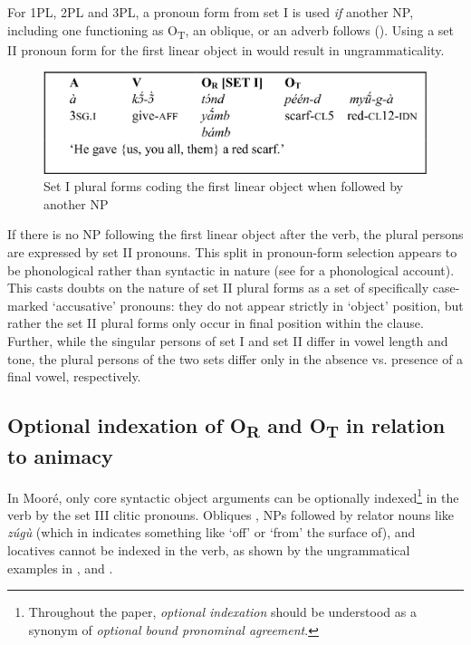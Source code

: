 \documentclass[output=paper]{langsci/langscibook}
\begin{document}
For 1PL, 2PL and 3PL, a pronoun form from set I is used \textit{if} another NP, including one functioning as O\textsubscript{T}, an oblique, or an adverb follows (). Using a set II pronoun form for the first linear object in  would result in ungrammaticality.

\begin{figure}[h]
\includegraphics[width=\textwidth]{figures/pacchiarottifig2}
\caption{Set I plural forms coding the first linear object when followed by another NP}
\label{fig:2.pacchiarotti}
\end{figure}

If there is no NP following the first linear object after the verb, the plural persons are expressed by set II pronouns. This split in pronoun-form selection appears to be phonological rather than syntactic in nature (see \citealt{peterson1971} for a phonological account). This casts doubts on the nature of set II plural forms as a set of specifically case-marked `accusative' pronouns: they do not appear strictly in `object' position, but rather the set II plural forms only occur in final position within the clause. Further, while the singular persons of set I and set II differ in vowel length and tone, the plural persons of the two sets differ only in the absence vs. presence of a final vowel, respectively. 

\subsection{Optional indexation of O\textsubscript{R} and O\textsubscript{T} in relation to animacy}\label{§4.4:optional.pacchiarotti}

In Mooré, only core syntactic object arguments can be optionally indexed\footnote{Throughout the paper, \textit{optional indexation} should be understood as a synonym of \textit{optional bound pronominal agreement}.} in the verb by the set III clitic pronouns. Obliques , NPs followed by relator nouns like \emph{zúgù} (which in  indicates something like `off' or `from' the surface of), and locatives  cannot be indexed in the verb, as shown by the ungrammatical examples in ,  and . 
\end{document}
